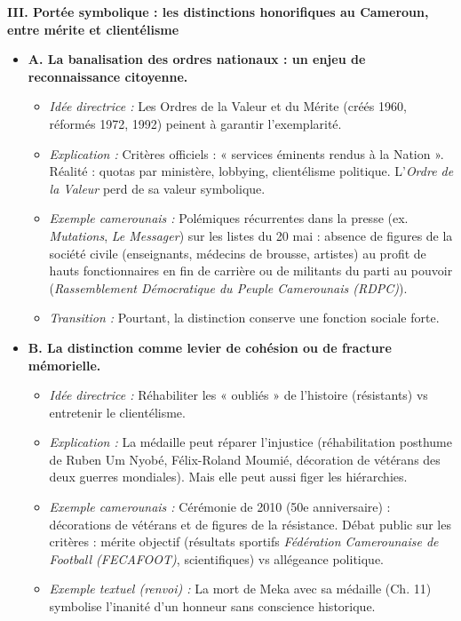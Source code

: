 \documentclass[11pt]{article}
\begin{document}
\begin{exoresolu}
\medskip
\noindent \textbf{III. Portée symbolique : les distinctions honorifiques au Cameroun, entre mérite et clientélisme}
\begin{itemize}
    \item \textbf{A. La banalisation des ordres nationaux : un enjeu de reconnaissance citoyenne.}
    \begin{itemize}
        \item \textit{Idée directrice :} Les Ordres de la Valeur et du Mérite (créés 1960, réformés 1972, 1992) peinent à garantir l'exemplarité.
        \item \textit{Explication :} Critères officiels : « services éminents rendus à la Nation ». Réalité : quotas par ministère, lobbying, clientélisme politique. L'\emph{Ordre de la Valeur} perd de sa valeur symbolique.
        \item \textit{Exemple camerounais :} Polémiques récurrentes dans la presse (ex. \emph{Mutations}, \emph{Le Messager}) sur les listes du 20 mai : absence de figures de la société civile (enseignants, médecins de brousse, artistes) au profit de hauts fonctionnaires en fin de carrière ou de militants du parti au pouvoir (\emph{Rassemblement Démocratique du Peuple Camerounais (RDPC)}).
        \item \textit{Transition :} Pourtant, la distinction conserve une fonction sociale forte.
    \end{itemize}
    \item \textbf{B. La distinction comme levier de cohésion ou de fracture mémorielle.}
    \begin{itemize}
        \item \textit{Idée directrice :} Réhabiliter les « oubliés » de l'histoire (résistants) vs entretenir le clientélisme.
        \item \textit{Explication :} La médaille peut réparer l'injustice (réhabilitation posthume de Ruben Um Nyobé, Félix-Roland Moumié, décoration de vétérans des deux guerres mondiales). Mais elle peut aussi figer les hiérarchies.
        \item \textit{Exemple camerounais :} Cérémonie de 2010 (50e anniversaire) : décorations de vétérans et de figures de la résistance. Débat public sur les critères : mérite objectif (résultats sportifs \emph{Fédération Camerounaise de Football (FECAFOOT)}, scientifiques) vs allégeance politique.
        \item \textit{Exemple textuel (renvoi) :} La mort de Meka avec sa médaille (Ch. 11) symbolise l'inanité d'un honneur sans conscience historique.
    \end{itemize}
\end{itemize}


\end{exoresolu}
\end{document}

